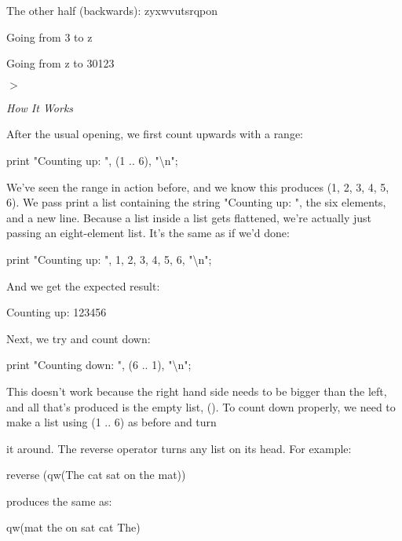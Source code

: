\documentclass[a4paper,11pt]{book}
\begin{document}
\noindent The other half (backwards): zyxwvutsrqpon

\noindent Going from 3 to z

\noindent Going from z to 30123

\noindent $>$

\noindent 

\noindent \textit{How It Works}

\noindent After the usual opening, we first count upwards with a range:

\noindent 

\noindent print "Counting up: ", (1 .. 6), "\textbackslash n";

\noindent 

\noindent We've seen the range in action before, and we know this produces (1, 2, 3, 4, 5, 6). We pass print a list containing the string "Counting up: ", the six elements, and a new line. Because a list inside a list gets flattened, we're actually just passing an eight-element list. It's the same as if we'd done:

\noindent 

\noindent print "Counting up: ", 1, 2, 3, 4, 5, 6, "\textbackslash n";

\noindent 

\noindent And we get the expected result:

\noindent 

\noindent Counting up: 123456

\noindent 

\noindent Next, we try and count down:

\noindent 

\noindent print "Counting down: ", (6 .. 1), "\textbackslash n";

\noindent 

\noindent This doesn't work because the right hand side needs to be bigger than the left, and all that's produced is the empty list, (). To count down properly, we need to make a list using (1 .. 6) as before and turn

\noindent it around. The reverse operator turns any list on its head. For example:

\noindent 

\noindent reverse (qw(The cat sat on the mat))

\noindent 

\noindent produces the same as:

\noindent 

\noindent qw(mat the on sat cat The)
\end{document}
